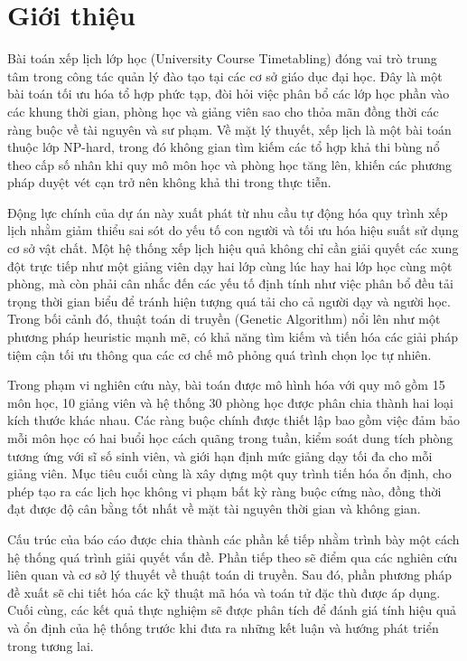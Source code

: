 \section{Giới thiệu}

Bài toán xếp lịch lớp học (University Course Timetabling) đóng vai trò trung tâm trong công tác quản lý đào tạo tại các cơ sở giáo dục đại học. Đây là một bài toán tối ưu hóa tổ hợp phức tạp, đòi hỏi việc phân bổ các lớp học phần vào các khung thời gian, phòng học và giảng viên sao cho thỏa mãn đồng thời các ràng buộc về tài nguyên và sư phạm. Về mặt lý thuyết, xếp lịch là một bài toán thuộc lớp NP-hard, trong đó không gian tìm kiếm các tổ hợp khả thi bùng nổ theo cấp số nhân khi quy mô môn học và phòng học tăng lên, khiến các phương pháp duyệt vét cạn trở nên không khả thi trong thực tiễn.

Động lực chính của dự án này xuất phát từ nhu cầu tự động hóa quy trình xếp lịch nhằm giảm thiểu sai sót do yếu tố con người và tối ưu hóa hiệu suất sử dụng cơ sở vật chất. Một hệ thống xếp lịch hiệu quả không chỉ cần giải quyết các xung đột trực tiếp như một giảng viên dạy hai lớp cùng lúc hay hai lớp học cùng một phòng, mà còn phải cân nhắc đến các yếu tố định tính như việc phân bổ đều tải trọng thời gian biểu để tránh hiện tượng quá tải cho cả người dạy và người học. Trong bối cảnh đó, thuật toán di truyền (Genetic Algorithm) nổi lên như một phương pháp heuristic mạnh mẽ, có khả năng tìm kiếm và tiến hóa các giải pháp tiệm cận tối ưu thông qua các cơ chế mô phỏng quá trình chọn lọc tự nhiên.

Trong phạm vi nghiên cứu này, bài toán được mô hình hóa với quy mô gồm 15 môn học, 10 giảng viên và hệ thống 30 phòng học được phân chia thành hai loại kích thước khác nhau. Các ràng buộc chính được thiết lập bao gồm việc đảm bảo mỗi môn học có hai buổi học cách quãng trong tuần, kiểm soát dung tích phòng tương ứng với sĩ số sinh viên, và giới hạn định mức giảng dạy tối đa cho mỗi giảng viên. Mục tiêu cuối cùng là xây dựng một quy trình tiến hóa ổn định, cho phép tạo ra các lịch học không vi phạm bất kỳ ràng buộc cứng nào, đồng thời đạt được độ cân bằng tốt nhất về mặt tài nguyên thời gian và không gian.

Cấu trúc của báo cáo được chia thành các phần kế tiếp nhằm trình bày một cách hệ thống quá trình giải quyết vấn đề. Phần tiếp theo sẽ điểm qua các nghiên cứu liên quan và cơ sở lý thuyết về thuật toán di truyền. Sau đó, phần phương pháp đề xuất sẽ chi tiết hóa các kỹ thuật mã hóa và toán tử đặc thù được áp dụng. Cuối cùng, các kết quả thực nghiệm sẽ được phân tích để đánh giá tính hiệu quả và ổn định của hệ thống trước khi đưa ra những kết luận và hướng phát triển trong tương lai.
